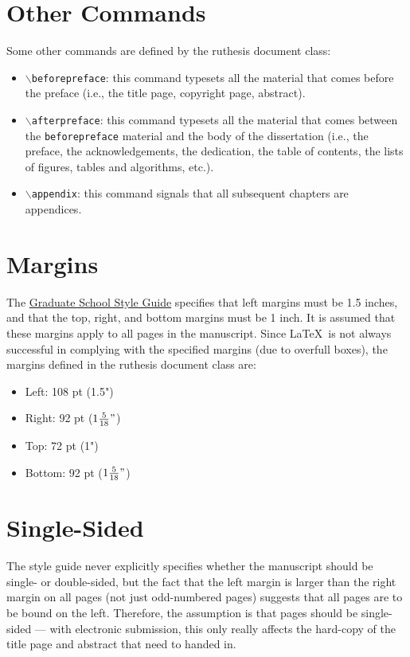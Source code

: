 \section{Other Commands}
Some other commands are defined by the ruthesis document class:
\begin{itemize}
\item $\backslash$\texttt{beforepreface}: this command typesets all the material that comes before the preface (i.e., the title page, copyright page, abstract).
\item $\backslash$\texttt{afterpreface}: this command typesets all the material that comes between the \texttt{beforepreface} material and the body of the dissertation (i.e., the preface, the acknowledgements, the dedication, the table of contents, the lists of figures, tables and algorithms, etc.).
\item $\backslash$\texttt{appendix}: this command signals that all subsequent chapters are appendices.
\end{itemize}

\section{Margins}
The \href{http://gsnb.rutgers.edu/guide.php3}{Graduate School Style Guide} specifies that left margins must be 1.5 inches, and that the top, right, and bottom margins must be 1 inch.
It is assumed that these margins apply to all pages in the manuscript.
Since \LaTeX\ is not always successful in complying with the specified margins (due to overfull boxes), the margins defined in the ruthesis document class are:
\begin{itemize}
\item Left: 108 pt (1.5")
\item Right: 92 pt (\ensuremath{1\frac{5}{18}"})
\item Top: 72 pt (1")
\item Bottom: 92 pt (\ensuremath{1\frac{5}{18}"})
\end{itemize}

\section{Single-Sided}
The style guide never explicitly specifies whether the manuscript should be single- or double-sided, but the fact that the left margin is larger than the right margin on all pages (not just odd-numbered pages) suggests that all pages are to be bound on the left.
Therefore, the assumption is that pages should be single-sided --- with electronic submission, this only really affects the hard-copy of the title page and abstract that need to handed in.